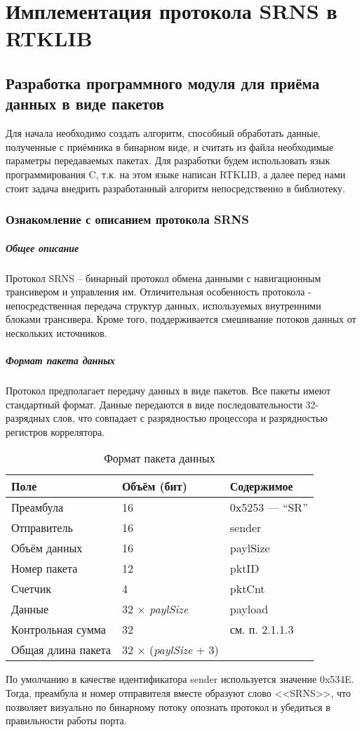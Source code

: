 \chapter{Имплементация протокола SRNS в RTKLIB}
\label{cha:simulation}

\section{Разработка программного модуля для приёма данных в виде пакетов}
Для начала необходимо создать алгоритм, способный обработать данные, полученные с приёмника в бинарном виде, и считать из файла необходимые параметры передаваемых пакетах. Для разработки будем использовать язык программирования C, т.к. на этом языке написан RTKLIB, а далее перед нами стоит задача внедрить разработанный алгоритм непосредственно в библиотеку.

\subsection{Ознакомление с описанием протокола SRNS}
\paragraph{Общее описание}

Протокол SRNS -- бинарный протокол обмена данными с навигационным трансивером и
управления им. Отличительная особенность протокола - непосредственная передача струк­тур данных, используемых внутренними блоками трансивера. Кроме того, поддерживается
смешивание потоков данных от нескольких источников.

\paragraph{Формат пакета данных}

Протокол предполагает передачу данных в виде пакетов. Все пакеты имеют стандартный
формат. Данные передаются в виде последовательности 32-разрядных слов, что совпадает с
разрядностью процессора и разрядностью регистров коррелятора.
\begin{longtable}[c]{|lll|}
	\caption{Формат пакета данных} \label{tab:formatsrns}\\
	\hline
	Поле & Объём (бит) & Содержимое \\
	\hline
	Преамбула & 16 & 0x5253 — “SR” \\
	Отправитель & 16 & sender \\
	Объём данных & 16 & paylSize \\
	Номер пакета & 12 & pktID \\
	Счетчик & 4 & pktCnt \\
	Данные & 32 × \textit{paylSize} & payload \\
	Контрольная сумма & 32 & см. п. 2.1.1.3 \\
	\hline
	Общая длина пакета & 32 × (\textit{paylSize} + 3) &  \\
	\hline
\end{longtable}
По умолчанию в качестве идентификатора sender используется значение 0x534E. Тогда,
преамбула и номер отправителя вместе образуют слово <<SRNS>>, что позволяет визуально по
бинарному потоку опознать протокол и убедиться в правильности работы порта.

